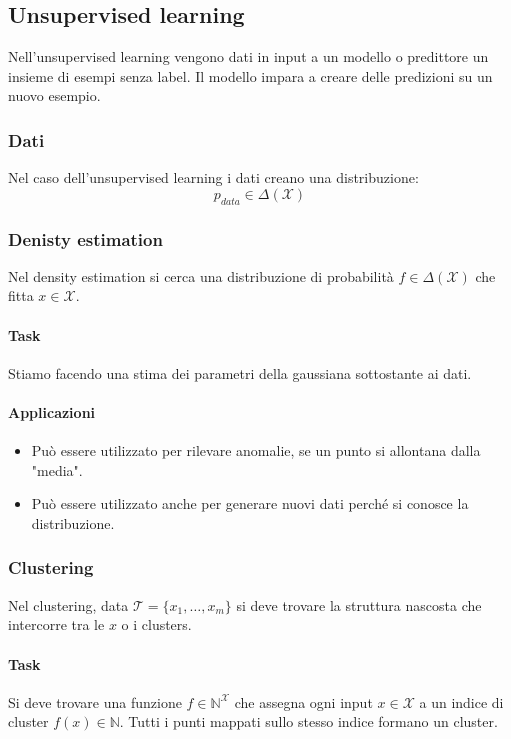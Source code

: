 	\subsection{Unsupervised learning}
	Nell'unsupervised learning vengono dati in input a un modello o predittore un insieme di esempi senza label.
	Il modello impara a creare delle predizioni su un nuovo esempio.
		
		\subsubsection{Dati}
		Nel caso dell'unsupervised learning i dati creano una distribuzione:
		$$p_{data}\in\Delta(\mathcal{X})$$
		\subsubsection{Denisty estimation}
		Nel density estimation si cerca una distribuzione di probabilità $f\in\Delta(\mathcal{X})$ che fitta $x\in\mathcal{X}$.
		
		\paragraph{Task}
		Stiamo facendo una stima dei parametri della gaussiana sottostante ai dati.
		
		\paragraph{Applicazioni}
		\begin{multicols}{2}
			\begin{itemize}
				\item Può essere utilizzato per rilevare anomalie, se un punto si allontana dalla "media".
				\item Può essere utilizzato anche per generare nuovi dati perché si conosce la distribuzione.
			\end{itemize}
		\end{multicols}
		
		\subsubsection{Clustering}
		Nel clustering, data $\mathcal{T}=\{x_1, \dots, x_m\}$ si deve trovare la struttura nascosta che intercorre tra le $x$ o i clusters.
		
		\paragraph{Task}
		Si deve trovare una funzione $f\in\mathbb{N}^{\mathcal{X}}$ che assegna ogni input $x\in\mathcal{X}$ a un indice di cluster $f(x)\in\mathbb{N}$.
		Tutti i punti mappati sullo stesso indice formano un cluster.
		

